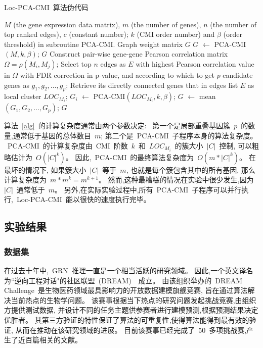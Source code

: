 \begin{algorithm}[!htbp]
    \caption{Loc-PCA-CMI~算法伪代码}
    \label{alg}
    \begin{algorithmic}[1]
    \Require $M$ (the gene expression data matrix), $m$ (the number of genes), $n$ (the number of top ranked edges), $c$ (constant number); $k$ (CMI order number) and $\beta$ (order threshold) in subroutine PCA-CMI.
    \Ensure Graph weight matrix $G$ 
    \State $G$ $\leftarrow$ PCA-CMI$(M, k, \beta)$;
    \State \Return $G$
    \Else
    \State Construct pair-wise gene-gene Pearson correlation matrix $\Omega = \rho(M_i, M_j)$;
    \State Select top $n$ edges as $E$ with highest Pearson correlation value in $\Omega$ with FDR correction in p-value, and according to which to get 
    $p$ candidate genes as $g_1,g_2,\ldots,g_{p}$;
      \State Retrieve its directly connected genes that in edges list $E$ as local cluster $LOC_{M_i}$;
    \EndFor
      \State $G_{i}$ $\leftarrow$ PCA-CMI$(LOC_{M_i}, k, \beta)$;
    \EndFor
    \State $G$ $\leftarrow$ mean$(G_{1},G_{2},\ldots,G_{p})$;
    \State \Return $G$ 
    \EndIf
    \end{algorithmic}
\end{algorithm}

算法~\ref{alg}~的计算复杂度通常由两个参数决定:
~第一个是局部重叠基因簇~$p$~的数量,通常低于基因的总体数目~$m$; 
第二个是~PCA-CMI~子程序本身的算法复杂度。
~PCA-CMI~的计算复杂度由~CMI~阶数~$k$~和~$LOC_{M_i}$~的簇大小~$|C|$~控制,
可以粗略估计为~$O(|C|^k)$。
因此,~PCA-CMI~的最终算法复杂度为~$O(m *|C|^k)$。
在最坏的情况下, 如果簇大小~$|C|$~等于~$m$, 也就是每个簇包含其中的所有基因, 
那么计算复杂度为~$m*m^k = m^{k+1}$。 
然而,这种最糟糕的情况在实验中很少发生,因为~$|C|$~通常低于~$m$。
另外,在实际实验过程中,所有~PCA-CMI~子程序可以并行执行,~Loc-PCA-CMI~能以很快的速度执行完毕。

\subsection{实验结果}

\subsubsection{数据集}

在过去十年中,~GRN~推理一直是一个相当活跃的研究领域。
因此,一个英文译名为``逆向工程对话"的社区联盟~(DREAM)~\cite{stolovitzky2007dialogue}~成立。
由该组织举办的~DREAM Challenge~是生物医药领域最具影响力的开放数据建模旗舰竞赛,
旨在通过算法解决当前热点的生物学问题。
该赛事根据当下热点的研究问题发起挑战竞赛,由组织方提供测试数据,
并设计不同的任务主题供参赛者进行建模预测,根据预测结果决定优胜者。
其第三方验证的特性保证了算法的可重复性,使得算法能得到最有效的验证,
从而在推动在该研究领域的进展。
目前该赛事已经完成了~50~多项挑战赛,产生了近百篇相关的文献。

